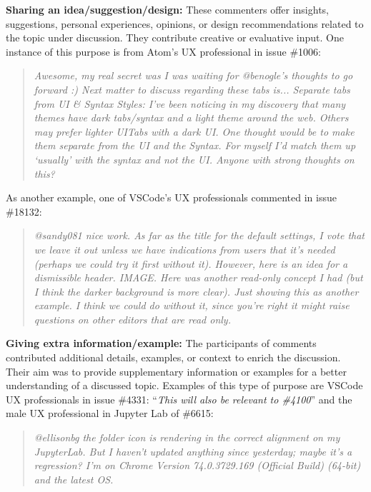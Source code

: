 \addvspace{4pt}
\textbf{Sharing an idea/suggestion/design:} These commenters offer insights, suggestions, personal experiences, opinions, or design recommendations related to the topic under discussion. They contribute creative or evaluative input. One instance of this purpose is from Atom's UX professional in issue \#1006:

\begin{quote}
    \textit{Awesome, my real secret was I was waiting for @benogle's thoughts to go forward :) Next matter to discuss regarding these tabs is... Separate tabs from UI \& Syntax Styles: I've been noticing in my discovery that many themes have dark tabs/syntax and a light theme around the web. Others may prefer lighter UI\/Tabs with a dark UI. One thought would be to make them separate from the UI and the Syntax. For myself I'd match them up `usually' with the syntax and not the UI. Anyone with strong thoughts on this?}
\end{quote}

As another example, one of VSCode's UX professionals commented in issue \#18132: 

\begin{quote}
    \textit{@sandy081 nice work. As far as the title for the default settings, I vote that we leave it out unless we have indications from users that it's needed (perhaps we could try it first without it). However, here is an idea for a dismissible header. IMAGE. Here was another read-only concept I had (but I think the darker background is more clear). Just showing this as another example. I think we could do without it, since you're right it might raise questions on other editors that are read only.}
\end{quote}

\addvspace{4pt}
\textbf{Giving extra information/example:} The participants of comments contributed additional details, examples, or context to enrich the discussion. Their aim was to provide supplementary information or examples for a better understanding of a discussed topic. Examples of this type of purpose are VSCode UX professionals in issue \#4331: ``\textit{This will also be relevant to \#4100}'' and the male UX professional in Jupyter Lab of \#6615:

\begin{quote}
    \textit{@ellisonbg the folder icon is rendering in the correct alignment on my JupyterLab. But I haven't updated anything since yesterday; maybe it's a regression? I'm on Chrome {Version 74.0.3729.169 (Official Build) (64-bit)} and the latest OS.}
\end{quote}

